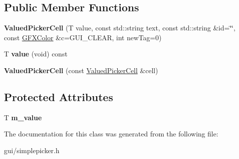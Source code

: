 \subsection*{Public Member Functions}
\begin{DoxyCompactItemize}
\item 
{\bfseries Valued\+Picker\+Cell} (T value, const std\+::string text, const std\+::string \&id=\char`\"{}\char`\"{}, const \hyperlink{structGFXColor}{G\+F\+X\+Color} \&c=G\+U\+I\+\_\+\+C\+L\+E\+AR, int new\+Tag=0)\hypertarget{classValuedPickerCell_aa3866fa3fa5c506ce9435e93aa4bc83c}{}\label{classValuedPickerCell_aa3866fa3fa5c506ce9435e93aa4bc83c}

\item 
T {\bfseries value} (void) const \hypertarget{classValuedPickerCell_a71dbdec250ee1e389bdfd37473b388b8}{}\label{classValuedPickerCell_a71dbdec250ee1e389bdfd37473b388b8}

\item 
{\bfseries Valued\+Picker\+Cell} (const \hyperlink{classValuedPickerCell}{Valued\+Picker\+Cell} \&cell)\hypertarget{classValuedPickerCell_abff57400c948f46667c2d4df5a5986f9}{}\label{classValuedPickerCell_abff57400c948f46667c2d4df5a5986f9}

\end{DoxyCompactItemize}
\subsection*{Protected Attributes}
\begin{DoxyCompactItemize}
\item 
T {\bfseries m\+\_\+value}\hypertarget{classValuedPickerCell_adf7905a9265c52b3e5b176df6411f463}{}\label{classValuedPickerCell_adf7905a9265c52b3e5b176df6411f463}

\end{DoxyCompactItemize}


The documentation for this class was generated from the following file\+:\begin{DoxyCompactItemize}
\item 
gui/simplepicker.\+h\end{DoxyCompactItemize}
